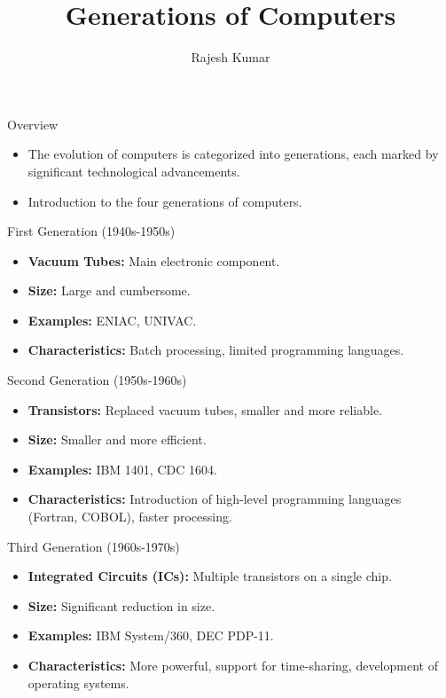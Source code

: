 \title{Generations of Computers}
\author{Rajesh Kumar}
\date{}

\begin{frame}
  \titlepage
\end{frame}

\begin{frame}{Overview}
  \begin{itemize}
    \item The evolution of computers is categorized into generations, each marked by significant technological advancements.
    \item Introduction to the four generations of computers.
  \end{itemize}
\end{frame}

\begin{frame}{First Generation (1940s-1950s)}
  \begin{itemize}
    \item \textbf{Vacuum Tubes:} Main electronic component.
    \item \textbf{Size:} Large and cumbersome.
    \item \textbf{Examples:} ENIAC, UNIVAC.
    \item \textbf{Characteristics:} Batch processing, limited programming languages.
  \end{itemize}
\end{frame}

\begin{frame}{Second Generation (1950s-1960s)}
  \begin{itemize}
    \item \textbf{Transistors:} Replaced vacuum tubes, smaller and more reliable.
    \item \textbf{Size:} Smaller and more efficient.
    \item \textbf{Examples:} IBM 1401, CDC 1604.
    \item \textbf{Characteristics:} Introduction of high-level programming languages (Fortran, COBOL), faster processing.
  \end{itemize}
\end{frame}

\begin{frame}{Third Generation (1960s-1970s)}
  \begin{itemize}
    \item \textbf{Integrated Circuits (ICs):} Multiple transistors on a single chip.
    \item \textbf{Size:} Significant reduction in size.
    \item \textbf{Examples:} IBM System/360, DEC PDP-11.
    \item \textbf{Characteristics:} More powerful, support for time-sharing, development of operating systems.
  \end{itemize}
\end{frame}

